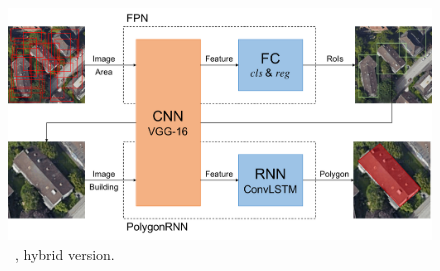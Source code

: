 \begin{figure}[!h]
	\centering
	\includegraphics[width=\fig\textwidth]{3-16.pdf}
    \caption[\modelnameshort\ , hybrid version.]{\modelnameshort\ , hybrid version.}
    \label{fig:hybmod}
\end{figure}